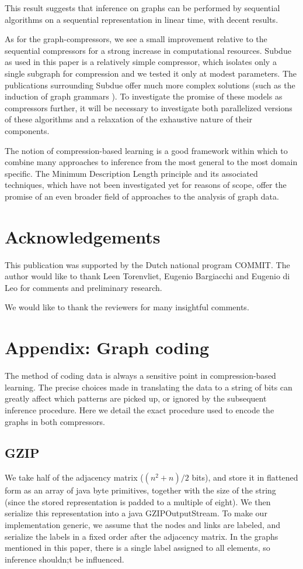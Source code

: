 \documentclass{article}
\begin{document}
This result suggests that inference on graphs can be performed by sequential algorithms on a sequential representation in linear time, with decent results.

As for the graph-compressors, we see a small improvement relative to the sequential compressors for a strong increase in computational resources. Subdue as used in this paper is a relatively simple compressor, which isolates only a single subgraph for compression and we tested it only at modest parameters. The publications surrounding Subdue offer much more complex solutions (such as the induction of graph grammars \cite{jonyer2004mdl}). To investigate the promise of these models as compressors further, it will be necessary to investigate both parallelized versions of these algorithms and a relaxation of the exhaustive nature of their components. 

The notion of compression-based learning is a good framework within which to combine many approaches to inference from the most general to the most domain specific. The Minimum Description Length principle and its associated techniques, which have not been investigated yet for reasons of scope, offer the promise of an even broader field of approaches to the analysis of graph data.

\section*{Acknowledgements}

This publication was supported by the Dutch national program COMMIT. The author would like to thank Leen Torenvliet, Eugenio Bargiacchi and Eugenio di Leo for comments and preliminary research.

We would like to thank the reviewers for many insightful comments.

\appendix

\section*{Appendix: Graph coding}

The method of coding data is always a sensitive point in compression-based learning. The precise choices made in translating the data to a string of bits can greatly affect which patterns are picked up, or ignored by the subsequent inference procedure. Here we detail the exact procedure used to encode the graphs in both compressors.

\subsection*{GZIP}
We take half of the adjacency matrix ($(n^2 + n)/2$ bits), and store it in flattened form as an array of java byte primitives, together with the size of the string (since the stored representation is padded to a multiple of eight). We then serialize this representation into a java GZIPOutputStream. To make our implementation generic, we assume that the nodes and links are labeled, and serialize the labels in a fixed order after the adjacency matrix. In the graphs mentioned in this paper, there is a single label assigned to all elements, so inference shouldn;t be influenced.
\end{document}
